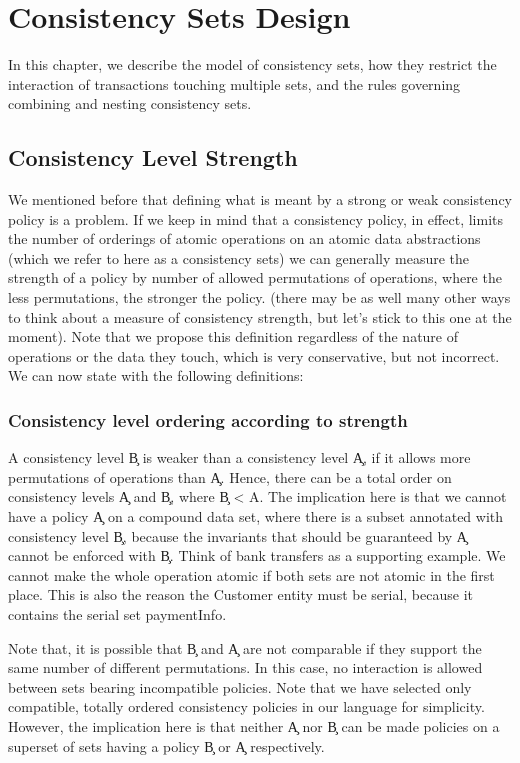 \section{Consistency Sets Design}

In this chapter, we describe the model of consistency sets, how they restrict
the interaction of transactions touching multiple sets, and the rules governing
combining and nesting consistency sets.

\subsection{Consistency Level Strength}
We mentioned before that defining what is meant by a strong or weak consistency
policy is a problem. If we keep in mind that a consistency policy, in effect, 
limits the number of orderings of atomic operations on an atomic data
abstractions (which we refer to here as a consistency sets) we can generally measure the strength of a policy
by number of allowed permutations of operations, where the less permutations, the stronger the policy.
(there may be as well many other ways to think about a measure of
consistency strength, but let's stick to this one at the moment). Note that we
propose this definition regardless of the nature of operations or the data they
touch, which is very conservative, but not incorrect. We can now state with the following definitions:

\subsubsection{Consistency level ordering according to strength}
A consistency level \c{B} is weaker than a consistency level \c{A}, if it
allows more permutations of operations than \c{A}. Hence, there can be a total order
on consistency levels \c{A} and \c{B}, where \c{B < A}. The implication here is that we
cannot have a policy \c{A} on a compound data set, where there is a subset annotated
with consistency level \c{B}, because the invariants that should be guaranteed by \c{A} cannot be enforced
with \c{B}. Think of bank transfers as a supporting example. We cannot make the
whole operation atomic if both sets are not atomic in the first place. This is
also the reason the Customer entity must be serial, because it contains the
serial set paymentInfo. 

Note that, it is possible that \c{B} and \c{A} are not comparable if they support the
same number of different permutations. In this case, no interaction is allowed
between sets bearing incompatible policies. Note that we have selected only
compatible, totally ordered consistency policies in our language for simplicity.
However, the implication here is that neither \c{A} nor \c{B} can be made policies on a superset of sets having a policy
\c{B} or \c{A} respectively. 


